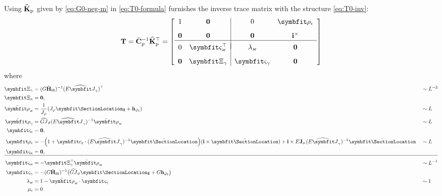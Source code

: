 Using \(\widehat{\mathbf{K}}_{\rm p}\) given by \eqref{eq:G0-neg-m} in \eqref{eq:T0-formula} furnishes the inverse trace matrix with the structure \eqref{eq:T0-inv}:
\[
\TraceDpDeRoot = \IesanEnergy^{-1}\IesanStiff^\top
=
\left[\begin{array}{cc|cc}
1 
& \mathbf{0}
& 0 
& \ShiftNK
\\[8pt]
\mathbf{0} & \mathbf{0} & \mathbf{0} 
& \FrameBasis^{\times} 
\\ \hline && \\[-8pt]
0 
&  \ShiftT^\top 
& \ShiftScaleT
& \mathbf{0}
\\[8pt]
  \mathbf{0} 
& \ShiftB
& \ShiftK 
& \mathbf{0}
\end{array}\right]
\]
where 
\begin{equation}
\begin{aligned}
\ShiftB &= (G\tilde{\mathbf{H}}_{bb})^{-1}(\ShearRigidity)^\top &&\sim L^{-2} \\ 
\ShiftA &= \mathbf{0},\\
\TraceTF &= \frac{1}{\Jsv}(\Jsv \CenterShearLocation + \mathbf{h}_{\WarpTwistIesan}) &&\sim L \\
\TraceFT 
 &= \TwistRigidity (\ShearRigidity)^{-1}\TraceTF &&\sim L \\
\ShiftN &= \mathbf{0},\\[2pt]
\ShiftNK &= -\Bigl(1 + \AxialCoupling\cdot (\ShearRigidity)^{-1}\CentroidLocation\Bigr)
  (\FrameBasis\times\CentroidLocation)
  + \FrameBasis\times E\IntRoR\,(\ShearRigidity)^{-1}\CentroidLocation && \sim L \\
\ShiftF &= \mathbf{0},\\ 
\hline \\[-8pt]
\ShiftT 
 &= -\ShiftB^\top\TraceTF && \sim L^{-1} \\
\ShiftK &= -(G\tilde{\mathbf{H}}_{bb})^{-1}\bigl(\TwistRigidity\CenterShearLocation + G\mathbf{h}_{\WarpTwistIesan}\bigr) \\
\ShiftScaleT 
&= 1 - \TraceTF\cdot \ShiftK && \sim 1 \\
\ShiftScaleN &= 0
\end{aligned}
\label{eq:energetic-trace-blocks}
\end{equation}


